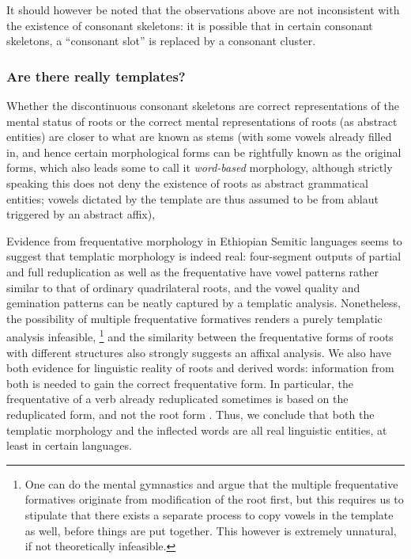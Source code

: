 \documentclass[a4paper, oneside, 12pt]{report}
\newcommand*{\term}[1]{\emph{#1}}
\begin{document}
It should however be noted that the observations above are not inconsistent with
the existence of consonant skeletons:
it is possible that in certain consonant skeletons,
a ``consonant slot'' is replaced by a consonant cluster.


\subsubsection{Are there really templates?}

Whether the discontinuous consonant skeletons are correct representations of the mental status of roots
or the correct mental representations of roots (as abstract entities) are closer to what are known as stems
(with some vowels already filled in, and hence certain morphological forms
can be rightfully known as the original forms,
which also leads some to call it \term{word-based} morphology,
although strictly speaking this does not deny the existence of roots as abstract grammatical entities;
vowels dictated by the template are thus assumed to be from ablaut triggered by an abstract affix),


Evidence from frequentative morphology in Ethiopian Semitic languages
seems to suggest that templatic morphology is indeed real:
four-segment outputs of partial and full reduplication as well as the frequentative
have vowel patterns rather similar to that of ordinary quadrilateral roots,
and the vowel quality and gemination patterns can be neatly captured by a templatic analysis.
Nonetheless, the possibility of multiple frequentative formatives renders 
a purely templatic analysis infeasible,%
\footnote{
    One can do the mental gymnastics and argue that the multiple frequentative formatives
    originate from modification of the root first,
    but this requires us to stipulate that there exists a separate process
    to copy vowels in the template as well,
    before things are put together.
    This however is extremely unnatural, if not theoretically infeasible.
}
and the similarity between the frequentative forms of roots with different structures
also strongly suggests an affixal analysis.
We also have both evidence for linguistic reality of roots and derived words:
information from both is needed to gain the correct frequentative form.
In particular, the frequentative of a verb already reduplicated 
sometimes is based on the reduplicated form, and not the root form
\citep{rose2008formation}.
Thus, we conclude that both the templatic morphology
and the inflected words are all real linguistic entities,
at least in certain languages.
\end{document}
